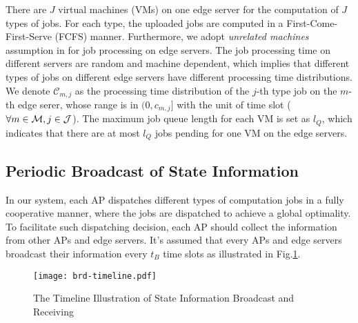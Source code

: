 There are $J$ virtual machines (VMs) on one edge server for the computation of $J$ types of jobs.
For each type, the uploaded jobs are computed in a First-Come-First-Serve (FCFS) manner.
Furthermore, we adopt \emph{unrelated machines} assumption in \cite{tan-online} for job processing on edge servers.
The job processing time on different servers are random and machine dependent, which implies that different types of jobs on different edge servers have different processing time distributions.
We denote $\mathcal{C}_{m,j}$ as the processing time distribution of the $j$-th type job on the $m$-th edge serer, whose range is in $(0, c_{m,j}]$ with the unit of time slot ($\forall m\in\mathcal{M}, j\in\mathcal{J}$).
The maximum job queue length for each VM is set as $l_Q$, which indicates that there are at most $l_Q$ jobs pending for one VM on the edge servers.

\subsection{Periodic Broadcast of State Information}
In our system, each AP dispatches different types of computation jobs in a fully cooperative manner, where the jobs are dispatched to achieve a global optimality.
To facilitate such dispatching decision, each AP should collect the information from other APs and edge servers.
It's assumed that every APs and edge servers broadcast their information every $t_B$ time slots as illustrated in Fig.\ref{fig:brd-timeline}.
\begin{figure}[ht]
    \centering
    \texttt{[image: brd-timeline.pdf]}
    \caption{The Timeline Illustration of State Information Broadcast and Receiving}
    \label{fig:brd-timeline}
\end{figure}

